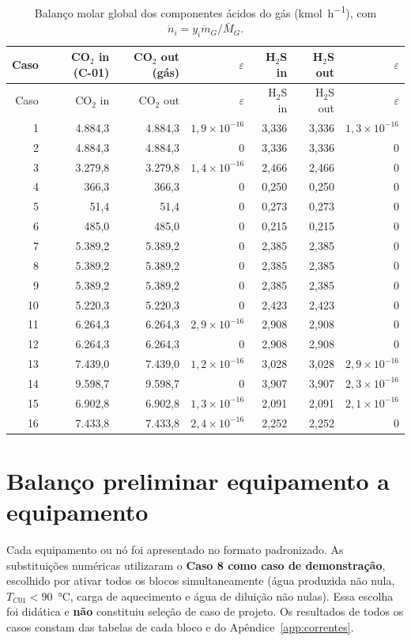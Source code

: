 \documentclass[11pt,a4paper]{article}
\numberwithin{equation}{section}
\numberwithin{table}{section}
\numberwithin{figure}{section}
\begin{document}
\begin{longtable}{rrrrrrr}
\caption{Balanço molar global dos componentes ácidos do gás (\si{\kilo\mole\per\hour}), com $\dot n_i=y_i\dot m_G/\bar M_G$.}\label{tab:molar}\\\toprule
Caso & CO$_2$ in (C-01) & CO$_2$ out (gás) & $\varepsilon$ & H$_2$S in & H$_2$S out & $\varepsilon$\\\midrule\endfirsthead
\toprule Caso & CO$_2$ in & CO$_2$ out & $\varepsilon$ & H$_2$S in & H$_2$S out & $\varepsilon$\\\midrule\endhead

1 & 4.884,3 & 4.884,3 & $1{,}9\times10^{-16}$ & 3,336 & 3,336 & $1{,}3\times10^{-16}$\\
2 & 4.884,3 & 4.884,3 & $0$ & 3,336 & 3,336 & $0$\\
3 & 3.279,8 & 3.279,8 & $1{,}4\times10^{-16}$ & 2,466 & 2,466 & $0$\\
4 & 366,3 & 366,3 & $0$ & 0,250 & 0,250 & $0$\\
5 & 51,4 & 51,4 & $0$ & 0,273 & 0,273 & $0$\\
6 & 485,0 & 485,0 & $0$ & 0,215 & 0,215 & $0$\\
7 & 5.389,2 & 5.389,2 & $0$ & 2,385 & 2,385 & $0$\\
8 & 5.389,2 & 5.389,2 & $0$ & 2,385 & 2,385 & $0$\\
9 & 5.389,2 & 5.389,2 & $0$ & 2,385 & 2,385 & $0$\\
10 & 5.220,3 & 5.220,3 & $0$ & 2,423 & 2,423 & $0$\\
11 & 6.264,3 & 6.264,3 & $2{,}9\times10^{-16}$ & 2,908 & 2,908 & $0$\\
12 & 6.264,3 & 6.264,3 & $0$ & 2,908 & 2,908 & $0$\\
13 & 7.439,0 & 7.439,0 & $1{,}2\times10^{-16}$ & 3,028 & 3,028 & $2{,}9\times10^{-16}$\\
14 & 9.598,7 & 9.598,7 & $0$ & 3,907 & 3,907 & $2{,}3\times10^{-16}$\\
15 & 6.902,8 & 6.902,8 & $1{,}3\times10^{-16}$ & 2,091 & 2,091 & $2{,}1\times10^{-16}$\\
16 & 7.433,8 & 7.433,8 & $2{,}4\times10^{-16}$ & 2,252 & 2,252 & $0$\\
\bottomrule\end{longtable}

\section{Balanço preliminar equipamento a equipamento}\label{sec:blocos}
Cada equipamento ou nó foi apresentado no formato padronizado. As substituições numéricas utilizaram o \textbf{Caso 8 como caso de demonstração}, escolhido por ativar todos os blocos simultaneamente (água produzida não nula, $T_{C01}<90$~\si{\celsius}, carga de aquecimento e água de diluição não nulas). Essa escolha foi didática e \textbf{não} constituiu seleção de caso de projeto. Os resultados de todos os casos constam das tabelas de cada bloco e do Apêndice~\ref{app:correntes}.
\end{document}
